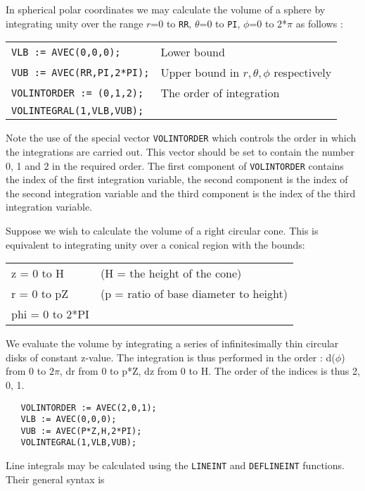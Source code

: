 \example{}

\noindent In spherical polar coordinates we may calculate the volume of a
sphere by integrating unity over the range $r$=0 to {\tt RR}, $\theta$=0 to
{\tt PI}, $\phi$=0 to 2*$\pi$ as follows :

\begin{tabular}{l l}
{\tt VLB := AVEC(0,0,0);} & Lower bound \\
{\tt VUB := AVEC(RR,PI,2*PI);} & Upper bound in $r, \theta, \phi$
 respectively \\
{\tt VOLINTORDER := (0,1,2);} & The order of integration \\
{\tt VOLINTEGRAL(1,VLB,VUB);} & \\
\end{tabular}

Note the use of the special vector {\tt VOLINTORDER} which controls
the order in which the integrations are carried out. This vector
should be set to contain the number 0, 1 and 2 in the required order.
The first component of {\tt VOLINTORDER} contains the index of the
first integration variable, the second component is the index of the
second integration variable and the third component is the index of
the third integration variable.

\example{}

Suppose we wish to calculate the volume of a right circular cone. This
is equivalent to integrating unity over a conical region with the
bounds:

\begin{tabular}{l l}
z = 0 to H  & (H = the height of the cone) \\
r = 0 to pZ & (p = ratio of base diameter to height) \\
phi = 0 to 2*PI & \\
\end{tabular}

We evaluate the volume by integrating a series of infinitesimally thin
circular disks of constant z-value. The integration is thus performed
in the order : d($\phi$) from 0 to $2\pi$, dr from 0 to p*Z, dz from 0 to H.
The order of the indices is thus 2, 0, 1.

\begin{verbatim}
   VOLINTORDER := AVEC(2,0,1);
   VLB := AVEC(0,0,0);
   VUB := AVEC(P*Z,H,2*PI);
   VOLINTEGRAL(1,VLB,VUB);
\end{verbatim}

Line integrals may be calculated using the {\tt LINEINT} and {\tt DEFLINEINT}
functions. Their general syntax is

